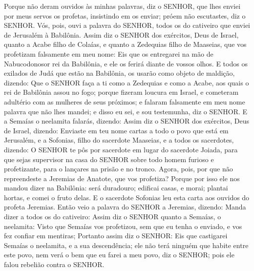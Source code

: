 {Porque não deram ouvidos às minhas palavras, diz o SENHOR, que lhes enviei por meus servos os profetas, insistindo em os enviar; próem não escutastes, diz o SENHOR.
Vós, pois, ouvi a palavra do SENHOR, todos os do cativeiro que enviei de Jerusalém à Babilônia.
Assim diz o SENHOR dos exércitos, Deus de Israel, quanto a Acabe filho de Colaías, e quanto a Zedequias filho de Maaseias, que vos profetizam falsamente em meu nome: Eis que os entregarei na mão de Nabucodonosor rei da Babilônia, e ele os ferirá diante de vossos olhos.
E todos os exilados de Judá que estão na Babilônia, os usarão como objeto de maldição, dizendo: Que o SENHOR faça a ti como a Zedequias e como a Acabe, aos quais o rei de Babilônia assou no fogo;
porque fizeram loucura em Israel, e cometeram adultério com as mulheres de seus próximos; e falaram falsamente em meu nome palavra que não lhes mandei; e disso eu sei, e sou testemunha, diz o SENHOR.
E a Semaías o neelamita falarás, dizendo:
Assim diz o SENHOR dos exércitos, Deus de Israel, dizendo: Enviaste em teu nome cartas a todo o povo que está em Jerusalém, e a Sofonias, filho do sacerdote Maaseias, e a todos os sacerdotes, dizendo:
O SENHOR te pôs por sacerdote em lugar do sacerdote Joiada, para que sejas supervisor na casa do SENHOR sobre todo homem furioso e profetizante, para o lançares na prisão e no tronco.
Agora, pois, por que não repreendeste a Jeremias de Anatote, que vos profetiza?
Porque por isso ele nos mandou dizer na Babilônia:
{} será duradouro; edificai casas, e
{} morai; plantai hortas, e comei o fruto delas.
E o sacerdote Sofonias leu esta carta aos ouvidos do profeta Jeremias.
Então veio a palavra do SENHOR a Jeremias, dizendo:
Manda dizer a todos os do cativeiro: Assim diz o SENHOR quanto a Semaías, o neelamita: Visto que Semaías vos profetizou, sem que eu tenha o enviado, e vos fez confiar em mentiras;
Portanto assim diz o SENHOR: Eis que castigarei Semaías o neelamita, e a sua descendência;
 ele não terá ninguém que habite entre este povo, nem verá o bem que eu farei a meu povo, diz o SENHOR; pois ele falou rebelião contra o SENHOR.

\par }

